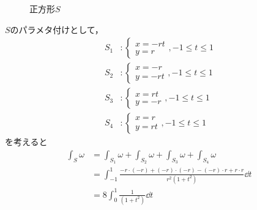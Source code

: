 \begin{enumerate}[(1)]
\begin{enumerate}[(i)]
\begin{itemize}
\begin{figure}[H]
                \caption{正方形$S$}
                \label{fig:Squ}
            \end{figure}
            $S$のパラメタ付けとして，
            \begin{align}
                S_1&:\begin{cases}
                    x=-rt\\
                    y=r
                \end{cases}
                ,-1\le t \le 1\\
                S_2&:\begin{cases}
                    x=-r\\
                    y=-rt
                \end{cases}
                ,-1\le t \le 1\\
                S_3&:\begin{cases}
                    x=rt\\
                    y=-r
                \end{cases}
                ,-1\le t \le 1\\
                S_4&:\begin{cases}
                    x=r\\
                    y=rt
                \end{cases}
                ,-1\le t \le 1
            \end{align}
            を考えると
            \begin{align}
                \int_S\omega
                &=\int_{S_1}\omega+\int_{S_2}\omega+\int_{S_3}\omega+\int_{S_4}\omega\\
                &=\int_{-1}^1\frac{-r\cdot(-r)+(-r)\cdot(-r)-(-r)\cdot r+r\cdot r}{r^2(1+t^2)}\dd{t}\\
                &=8\int_0^1\frac{1}{(1+t^2)}\dd{t}\\

\end{align}
\end{itemize}
\end{enumerate}
\end{enumerate}
